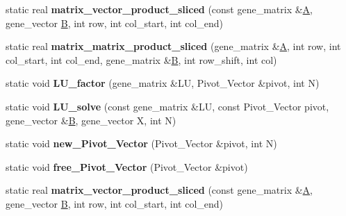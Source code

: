 \begin{DoxyCompactItemize}
\item 
\mbox{\label{classblitz___l_u__solve__interface_a9ffd8f9541d9559c4b0f6d0532587e76}} 
static real {\bfseries matrix\+\_\+vector\+\_\+product\+\_\+sliced} (const gene\+\_\+matrix \&\hyperlink{group___core___module_class_eigen_1_1_matrix}{A}, gene\+\_\+vector \hyperlink{group___core___module_class_eigen_1_1_matrix}{B}, int row, int col\+\_\+start, int col\+\_\+end)
\item 
\mbox{\label{classblitz___l_u__solve__interface_afebfcffc1b05ad809cc704a0aa54a26e}} 
static real {\bfseries matrix\+\_\+matrix\+\_\+product\+\_\+sliced} (gene\+\_\+matrix \&\hyperlink{group___core___module_class_eigen_1_1_matrix}{A}, int row, int col\+\_\+start, int col\+\_\+end, gene\+\_\+matrix \&\hyperlink{group___core___module_class_eigen_1_1_matrix}{B}, int row\+\_\+shift, int col)
\item 
\mbox{\label{classblitz___l_u__solve__interface_a35ac67142990402c20597bf9a8d8d9b9}} 
static void {\bfseries L\+U\+\_\+factor} (gene\+\_\+matrix \&LU, Pivot\+\_\+\+Vector \&pivot, int N)
\item 
\mbox{\label{classblitz___l_u__solve__interface_acb9e0965fe92bb88c1b6d4e2a78906be}} 
static void {\bfseries L\+U\+\_\+solve} (const gene\+\_\+matrix \&LU, const Pivot\+\_\+\+Vector pivot, gene\+\_\+vector \&\hyperlink{group___core___module_class_eigen_1_1_matrix}{B}, gene\+\_\+vector X, int N)
\item 
\mbox{\label{classblitz___l_u__solve__interface_adafba612b512655463cd9d1fa7239d8c}} 
static void {\bfseries new\+\_\+\+Pivot\+\_\+\+Vector} (Pivot\+\_\+\+Vector \&pivot, int N)
\item 
\mbox{\label{classblitz___l_u__solve__interface_ae58840dbbcb44f84500e26d0a212b219}} 
static void {\bfseries free\+\_\+\+Pivot\+\_\+\+Vector} (Pivot\+\_\+\+Vector \&pivot)
\item 
\mbox{\label{classblitz___l_u__solve__interface_a9ffd8f9541d9559c4b0f6d0532587e76}} 
static real {\bfseries matrix\+\_\+vector\+\_\+product\+\_\+sliced} (const gene\+\_\+matrix \&\hyperlink{group___core___module_class_eigen_1_1_matrix}{A}, gene\+\_\+vector \hyperlink{group___core___module_class_eigen_1_1_matrix}{B}, int row, int col\+\_\+start, int col\+\_\+end)

\end{DoxyCompactItemize}
